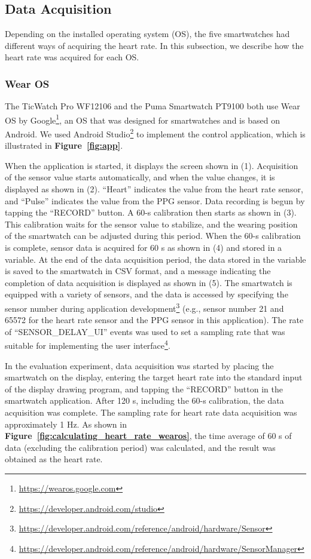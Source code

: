 \documentclass[sigchi,authordraft]{acmart}
\newcommand\figref[1]{\textbf{Figure~\ref{fig:#1}}}
\begin{document}
\subsection{Data Acquisition}
Depending on the installed operating system (OS), the five smartwatches had different ways of acquiring the heart rate. In this subsection, we describe how the heart rate was acquired for each OS.

\subsubsection{Wear OS}
The TicWatch Pro WF12106 and the Puma Smartwatch PT9100 both use Wear OS by Google\footnote{\url{https://wearos.google.com}}, an OS that was designed for smartwatches and is based on Android. We used Android Studio\footnote{\url{https://developer.android.com/studio}} to implement the control application, which is illustrated in \figref{app}.\par

When the application is started, it displays the screen shown in (1). Acquisition of the sensor value starts automatically, and when the value changes, it is displayed as shown in (2). ``Heart'' indicates the value from the heart rate sensor, and ``Pulse'' indicates the value from the PPG sensor. Data recording is begun by tapping the ``RECORD'' button. A 60-s calibration then starts as shown in (3). This calibration waits for the sensor value to stabilize, and the wearing position of the smartwatch can be adjusted during this period. When the 60-s calibration is complete, sensor data is acquired for 60 s as shown in (4) and stored in a variable. At the end of the data acquisition period, the data stored in the variable is saved to the smartwatch in CSV format, and a message indicating the completion of data acquisition is displayed as shown in (5). The smartwatch is equipped with a variety of sensors, and the data is accessed by specifying the sensor number during application development\footnote{\url{https://developer.android.com/reference/android/hardware/Sensor}} (e.g., sensor number 21 and 65572 for the heart rate sensor and the PPG sensor in this application). The rate of ``SENSOR\_DELAY\_UI'' events was used to set a sampling rate that was suitable for implementing the user interface\footnote{\url{https://developer.android.com/reference/android/hardware/SensorManager}}.\par

In the evaluation experiment, data acquisition was started by placing the smartwatch on the display, entering the target heart rate into the standard input of the display drawing program, and tapping the ``RECORD'' button in the smartwatch application. After 120 s, including the 60-s calibration, the data acquisition was complete. The sampling rate for heart rate data acquisition was approximately 1 Hz. As shown in \figref{calculating_heart_rate_wearos}, the time average of 60 s of data (excluding the calibration period) was calculated, and the result was obtained as the heart rate.
\end{document}

